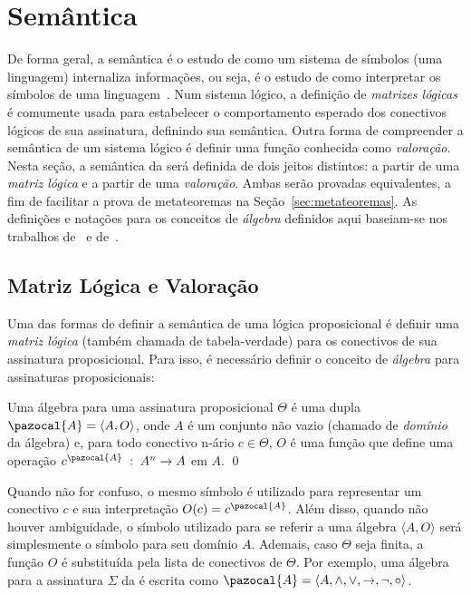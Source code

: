 \section{Semântica}
\label{sec:semantica}
    De forma geral, a semântica é o estudo de como um sistema de símbolos (uma linguagem) internaliza informações, ou seja, é o estudo de como interpretar os símbolos de uma linguagem~\cite{brown2005encyclopedia}. Num sistema lógico, a definição de \textit{matrizes lógicas} é comumente usada para estabelecer o comportamento esperado dos conectivos lógicos de sua assinatura, definindo sua semântica. Outra forma de compreender a semântica de um sistema lógico é definir uma função conhecida como \textit{valoração}. Nesta seção, a semântica da \lfium{} será definida de dois jeitos distintos: a partir de uma \textit{matriz lógica} e a partir de uma \textit{valoração}. Ambas serão provadas equivalentes, a fim de facilitar a prova de metateoremas na Seção~\ref{sec:metateoremas}. As definições e notações para os conceitos de \textit{álgebra} definidos aqui baseiam-se nos trabalhos de~ e de~.
    \subsection{Matriz Lógica e Valoração}
        Uma das formas de definir a semântica de uma lógica proposicional é definir uma \textit{matriz lógica} (também chamada de tabela-verdade) para os conectivos de sua assinatura proposicional. Para isso, é necessário definir o conceito de \textit{álgebra} para assinaturas proposicionais:
        \begin{definicao}
        \label{def:algebra}
            Uma álgebra para uma assinatura proposicional $\Theta$ é uma dupla $\pazocal{A} = \langle A, O \rangle$, onde $A$ é um conjunto não vazio (chamado de \textit{domínio} da álgebra) e, para todo conectivo n-ário $c \in \Theta$,  $O$ é uma função que define uma operação $c^{\pazocal{A}} \; : \; A^{n} \rightarrow A$ em $A$. \qed{}
        \end{definicao}

        Quando não for confuso, o mesmo símbolo é utilizado para representar um conectivo $c$ e sua interpretação $O(c) = c^{\pazocal{A}}$. Além disso, quando não houver ambiguidade, o símbolo utilizado para se referir a uma álgebra $\langle A, O \rangle$ será simplesmente o símbolo para seu domínio $A$. Ademais, caso $\Theta$ seja finita, a função $O$ é substituída pela lista de conectivos de $\Theta$. Por exemplo, uma álgebra para a assinatura $\Sigma$ da \lfium{} é escrita como $\pazocal{A} = \langle A,\land, \lor, \rightarrow, \neg, \circ \rangle$.

